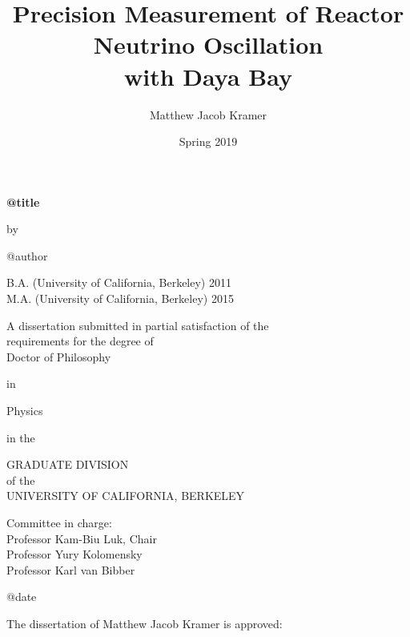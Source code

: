 \documentclass[11pt,oneside]{memoir}
\title{Precision Measurement of Reactor Neutrino Oscillation\\ with Daya Bay}
\author{Matthew Jacob Kramer}
\date{Spring 2019}
\def\frontsize{}
\def\mylarge{\large}            %
\begin{document}
\nocite{*}

\thispagestyle{empty}
{\mylarge

\begin{center}
  \textbf{\csname @title\endcsname}
  
  \vspace{\baselineskip} by %

  \vspace{\baselineskip} \csname @author\endcsname

  \vspace{2\baselineskip}
  B.A. (University of California, Berkeley) 2011\\
  M.A. (University of California, Berkeley) 2015
  \vspace{2\baselineskip}

  A dissertation submitted in partial satisfaction of the\\
  \OnehalfSpacing\frontsize
  requirements for the degree of\\
  Doctor of Philosophy

  \SingleSpacing\frontsize in
  \par\vspace{\baselineskip} Physics
  \par\vspace{\baselineskip} in the
  \par\vspace{\baselineskip}
  GRADUATE DIVISION\\
  \OnehalfSpacing\frontsize
  of the\\
  UNIVERSITY OF CALIFORNIA, BERKELEY

  \vfill\SingleSpacing\frontsize

  Committee in charge:\\
  Professor Kam-Biu Luk, Chair\\
  Professor Yury Kolomensky\\
  Professor Karl van Bibber

  \vspace{2\baselineskip} \csname @date\endcsname
\end{center}

\clearpage
\thispagestyle{empty}
\DoubleSpacing

\begin{minipage}{0.85\linewidth}
  \begin{center}
    The dissertation of Matthew Jacob Kramer is approved:


\end{center}
\end{minipage}}
\end{document}
